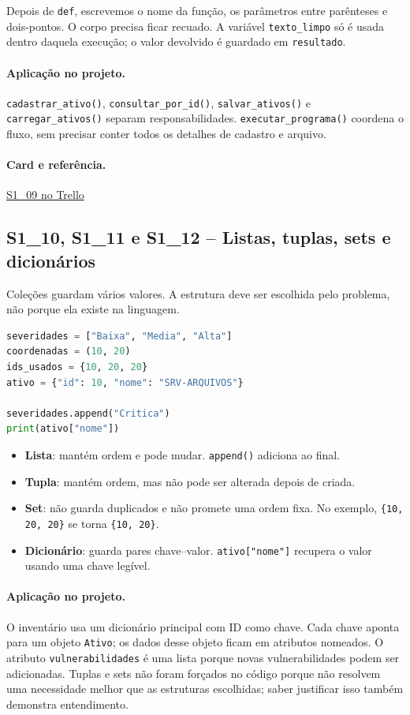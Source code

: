 \documentclass[11pt,a4paper]{article}
\newcommand{\projeto}{\paragraph{Aplicação no projeto.}}
\newcommand{\referencia}[2]{\paragraph{Card e referência.}\href{#1}{#2}}
\newcommand{\cardsection}[1]{\Needspace{12\baselineskip}\subsection{#1}}
\begin{document}
Depois de \texttt{def}, escrevemos o nome da função, os parâmetros entre parênteses e dois-pontos. O corpo precisa ficar recuado. A variável \texttt{texto\_limpo} só é usada dentro daquela execução; o valor devolvido é guardado em \texttt{resultado}.

\projeto
\texttt{cadastrar\_ativo()}, \texttt{consultar\_por\_id()}, \texttt{salvar\_ativos()} e \texttt{carregar\_ativos()} separam responsabilidades. \texttt{executar\_programa()} coordena o fluxo, sem precisar conter todos os detalhes de cadastro e arquivo.

\referencia{https://trello.com/c/XWD40Pgo}{S1\_09 no Trello}

\cardsection{S1\_10, S1\_11 e S1\_12 -- Listas, tuplas, sets e dicionários}

Coleções guardam vários valores. A estrutura deve ser escolhida pelo problema, não porque ela existe na linguagem.

\begin{lstlisting}[language=Python,caption={Comparação entre coleções}]
severidades = ["Baixa", "Media", "Alta"]
coordenadas = (10, 20)
ids_usados = {10, 20, 20}
ativo = {"id": 10, "nome": "SRV-ARQUIVOS"}

severidades.append("Critica")
print(ativo["nome"])
\end{lstlisting}

\begin{itemize}
  \item \textbf{Lista}: mantém ordem e pode mudar. \texttt{append()} adiciona ao final.
  \item \textbf{Tupla}: mantém ordem, mas não pode ser alterada depois de criada.
  \item \textbf{Set}: não guarda duplicados e não promete uma ordem fixa. No exemplo, \texttt{\{10, 20, 20\}} se torna \texttt{\{10, 20\}}.
  \item \textbf{Dicionário}: guarda pares chave--valor. \texttt{ativo["nome"]} recupera o valor usando uma chave legível.
\end{itemize}

\projeto
O inventário usa um dicionário principal com ID como chave. Cada chave aponta para um objeto \texttt{Ativo}; os dados desse objeto ficam em atributos nomeados. O atributo \texttt{vulnerabilidades} é uma lista porque novas vulnerabilidades podem ser adicionadas. Tuplas e sets não foram forçados no código porque não resolvem uma necessidade melhor que as estruturas escolhidas; saber justificar isso também demonstra entendimento.
\end{document}
